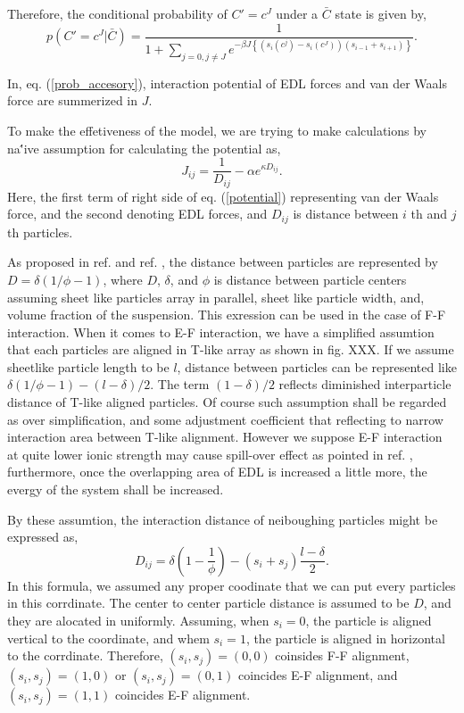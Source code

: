 \documentclass{article}
\begin{document}
Therefore, the conditional probability of $C' = c^J$ under a $\bar{C}$ state is given by,
\begin{equation}
 p (C' = c^J|\bar{C}) = \frac{1}{1+\sum_{j=0, j\not= J}e^{-\beta J \left\{(s_i (c^j) - s_i (c^J))(s_{i-1} + s_{i+1})\right\}}}. 
  \label{prob_accesory}
\end{equation}

In, eq. (\ref{prob_accesory}), interaction potential of EDL forces and van der Waals force are summerized in $J$.

To make the effetiveness of the model, we are trying to make calculations by na\''{i}ve assumption for calculating the potential as,
\begin{equation}
 J_{ij} = \frac{1}{D_{ij}} - \alpha e^{\kappa D_{ij}}.   \label{potential}
\end{equation}
Here, the first term of right side of eq. (\ref{potential}) representing van der Waals force, and the second denoting EDL forces, and $D_{ij}$ is 
distance between $i$ th and $j$ th particles.

As proposed in ref. \cite{adachi} and ref. \cite{sakairi}, the distance between particles are represented by $D = \delta (1/\phi - 1)$,
where $D$, $\delta$, and $\phi$ is distance between particle centers assuming sheet like particles array in parallel, sheet like particle width,
 and, volume fraction of the suspension. This exression can be used in the case of F-F interaction. 
When it comes to E-F interaction, we have a simplified assumtion that each particles are aligned in T-like array as shown in fig. XXX.
If we assume sheetlike particle length to be $l$, distance between particles can be represented like $\delta (1/\phi - 1) - (l-\delta)/2$.
The term $(1-\delta)/2$ reflects diminished interparticle distance of T-like aligned particles.
Of course such assumption shall be regarded as over simplification, and some adjustment coefficient that reflecting to narrow interaction area
between T-like alignment. However we suppose E-F interaction at quite lower ionic strength may cause spill-over effect as pointed in ref. \cite{sposito},
furthermore, once the overlapping area of EDL is increased a little more, the evergy of the system shall be increased.

By these assumtion, the interaction distance of neiboughing particles might be expressed as,
\begin{equation}
 D_{ij} = \delta\left(1 - \frac{1}{\phi}\right) - (s_i + s_j)\frac{l-\delta}{2}.
\end{equation}
In this formula, we assumed any proper coodinate that we can put every particles in this corrdinate.
The center to center particle distance is assumed to be $D$, and they are alocated in uniformly.
Assuming, when $s_i = 0$, the particle is aligned vertical to the coordinate, and whem $s_i = 1$, the particle is aligned in horizontal to the corrdinate.
Therefore, $(s_i, s_j) = (0, 0)$ coinsides F-F alignment,  $(s_i, s_j) = (1, 0)$ or $(s_i, s_j) = (0, 1)$ coincides E-F alignment, and $(s_i, s_j) = (1, 1)$ coincides E-F alignment.
\end{document}
